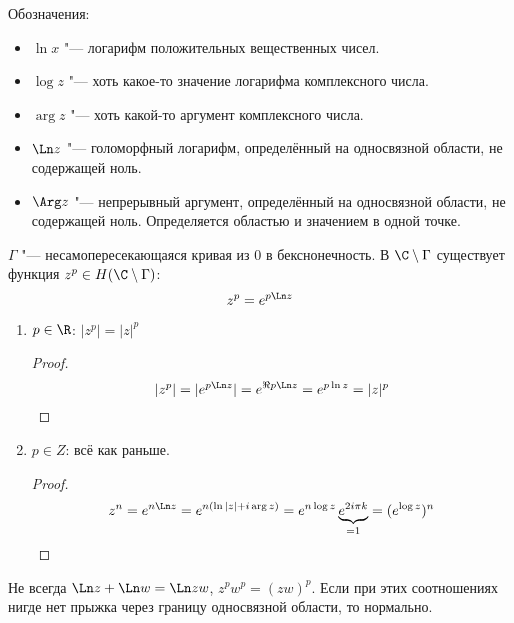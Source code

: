 Обозначения:
\begin{itemize}
	\item $\ln x$ "--- логарифм положительных вещественных чисел.
	\item $\log z$ "--- хоть какое-то значение логарифма комплексного числа.
	\item $\arg z$ "--- хоть какой-то аргумент комплексного числа.
	\item $\Ln z$ "--- голоморфный логарифм, определённый на односвязной области, не содержащей ноль.
	\item $\Arg z$ "--- непрерывный аргумент, определённый на односвязной области, не содержащей ноль.
		Определяется областью и значением в одной точке.
\end{itemize}

\begin{conseq}
	$\Gamma$ "--- несамопересекающаяся кривая из 0 в бекснонечность.
	В $\C \setminus \Gamma$ существует функция $z^p \in H(\C \setminus \Gamma)$:
	\[ z^p = e^{p\Ln z} \]
	\begin{enumerate}
	\item
		$p \in \R$: $|z^p| = |z|^p$
		\begin{proof}
			\[ |z^p| = |e^{p\Ln z}| = e^{\Re p\Ln z} = e^{p\ln z} = |z|^p \]
		\end{proof}

	\item
		$p \in Z$: всё как раньше.
		\begin{proof}
			\[ z^n = e^{n\Ln z} = e^{n(\ln |z| + i\arg z)} = e^{n\log z} \underbrace{e^{2i\pi k}}_{=1} = (e^{\log z})^n \]
		\end{proof}
	\end{enumerate}

	\begin{Rem}
		Не всегда $\Ln z + \Ln w = \Ln zw$, $z^pw^p = (zw)^p$.
		Если при этих соотношениях нигде нет прыжка через границу односвязной области, то нормально.
	\end{Rem}
\end{conseq}

